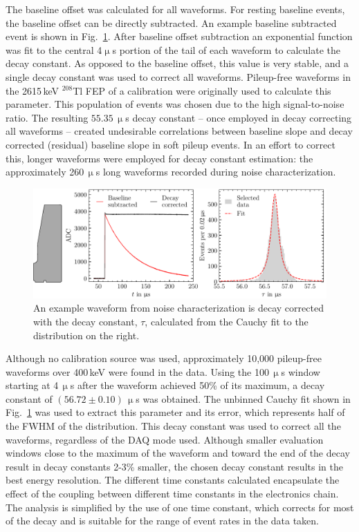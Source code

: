 The baseline offset was calculated for all waveforms. For resting baseline events, the baseline offset can be directly subtracted. An example baseline subtracted event is shown in Fig.~\ref{fig:decay_correction}. After baseline offset subtraction an exponential function was fit to the central 4$\upmu$s portion of the tail of each waveform to calculate the decay constant. As opposed to the baseline offset, this value is very stable, and a single decay constant was used to correct all waveforms. Pileup-free waveforms in the 2615\,keV $^{208}$Tl FEP of a \ThS{} calibration were originally used to calculate this parameter. This population of events was chosen due to the high signal-to-noise ratio. The resulting $55.35\,\upmu$s decay constant -- once employed in decay correcting all waveforms -- created undesirable correlations between baseline slope and decay corrected (residual) baseline slope in soft pileup events. In an effort to correct this, longer waveforms were employed for decay constant estimation: the approximately 260\,$\upmu$s long waveforms recorded during noise characterization. 
\begin{figure}[htb]
    \centering
    \includegraphics[width=6in]{figs/param/decay_correction_longwf_6_9in.pdf}
    \caption{An example waveform from noise characterization is decay corrected with the decay constant, $\tau$, calculated from the Cauchy fit to the distribution on the right.}
    \label{fig:decay_correction}
\end{figure}

Although no calibration source was used, approximately 10,000 pileup-free waveforms over 400\,keV were found in the data. Using the 100\,$\upmu$s window starting at 4\,$\upmu$s after the waveform achieved 50\% of its maximum, a decay constant of $(56.72 \pm 0.10)\,\upmu$s was obtained. The unbinned Cauchy fit shown in Fig.~\ref{fig:decay_correction} was used to extract this parameter and its error, which represents half of the FWHM of the distribution. This decay constant was used to correct all the waveforms, regardless of the DAQ mode used. Although smaller evaluation windows close to the maximum of the waveform and toward the end of the decay result in decay constants 2-3\% smaller, the chosen decay constant results in the best energy resolution. The different time constants calculated encapsulate the effect of the coupling between different time constants in the electronics chain. The analysis is simplified by the use of one time constant, which corrects for most of the decay and is suitable for the range of event rates in the data taken.

